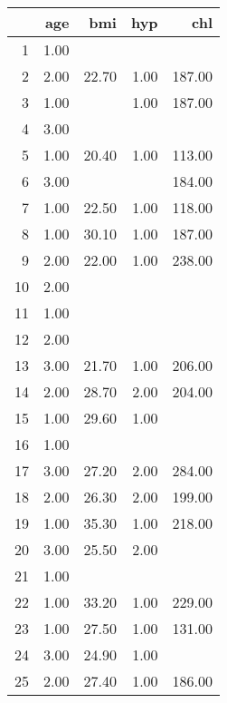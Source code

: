 \documentclass[10pt, fullpage, a4paper, titlepage]{article}
\begin{document}
\begin{table}[ht]
\centering
\begin{tabular}{rrrrr}
  \hline
 & age & bmi & hyp & chl \\ 
  \hline
1 & 1.00 &  &  &  \\ 
  2 & 2.00 & 22.70 & 1.00 & 187.00 \\ 
  3 & 1.00 &  & 1.00 & 187.00 \\ 
  4 & 3.00 &  &  &  \\ 
  5 & 1.00 & 20.40 & 1.00 & 113.00 \\ 
  6 & 3.00 &  &  & 184.00 \\ 
  7 & 1.00 & 22.50 & 1.00 & 118.00 \\ 
  8 & 1.00 & 30.10 & 1.00 & 187.00 \\ 
  9 & 2.00 & 22.00 & 1.00 & 238.00 \\ 
  10 & 2.00 &  &  &  \\ 
  11 & 1.00 &  &  &  \\ 
  12 & 2.00 &  &  &  \\ 
  13 & 3.00 & 21.70 & 1.00 & 206.00 \\ 
  14 & 2.00 & 28.70 & 2.00 & 204.00 \\ 
  15 & 1.00 & 29.60 & 1.00 &  \\ 
  16 & 1.00 &  &  &  \\ 
  17 & 3.00 & 27.20 & 2.00 & 284.00 \\ 
  18 & 2.00 & 26.30 & 2.00 & 199.00 \\ 
  19 & 1.00 & 35.30 & 1.00 & 218.00 \\ 
  20 & 3.00 & 25.50 & 2.00 &  \\ 
  21 & 1.00 &  &  &  \\ 
  22 & 1.00 & 33.20 & 1.00 & 229.00 \\ 
  23 & 1.00 & 27.50 & 1.00 & 131.00 \\ 
  24 & 3.00 & 24.90 & 1.00 &  \\ 
  25 & 2.00 & 27.40 & 1.00 & 186.00 \\ 
   \hline
\end{tabular}
\end{table}
\end{document}
